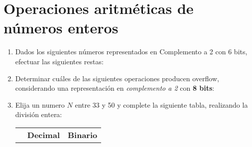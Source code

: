 \documentclass[12pt]{article}
\begin{document}
\section{Operaciones aritméticas de números enteros}

\begin{enumerate}

    \item Dados los siguientes números representados en Complemento a 2 con 6
        bits, efectuar las siguientes restas:
    

    \item Determinar cuáles de las siguientes operaciones producen overflow,
        considerando una representación en \emph{complemento a 2} con
        \textbf{8 bits}:


    \item Elija un numero $N$ entre 33 y 50 y complete la siguiente tabla,
        realizando la división entera:

        \begin{center}

            \begin{tabular}[t]{|c|c|c|}

            \cline{2-3}

            \multicolumn{1}{c|}{}& \textbf{Decimal} & \textbf{Binario} \\


\end{tabular}
\end{center}
\end{enumerate}
\end{document}
